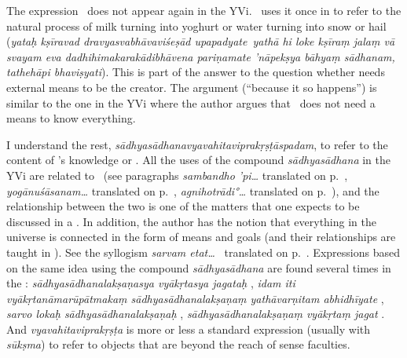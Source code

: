 {  The expression \dravyasvabhava\ does not appear again in the YVi.  \Sankara\ uses it once in  to refer to the natural process of milk turning into yoghurt or water turning into snow or hail (\emph{yataḥ kṣīravad dravyasvabhāvaviśeṣād upa\-padya\-te\dd\ yathā hi loke kṣīraṃ jalaṃ vā svayam eva dadhihimakarakādibhāvena pariṇamate ’nāpekṣya bāhyaṃ sādhanam, tathehāpi bhaviṣyati\dd}).  This is part of the answer to the question whether \Brahman{} needs external means to be the creator.  The argument (``because it so happens'') is similar to the one in the YVi where the author argues that \Isvara\ does not need a means to know everything.  %

I understand the rest, \emph{sādhyasādhanavyavahitaviprakṛṣṭāspadam}, to refer to the content of \Isvara's knowledge or \sastra.  All the uses of the compound \emph{sādhyasādhana} in the YVi are related to \sastra\ (see paragraphs \emph{sambandho 'pi\ldots}  translated on p.~\pageref{SMBDHPI}, \emph{yogānuśāsanam\ldots}  translated on p.~\pageref{YGNSSM}, \emph{agnihotrādi°\ldots}  translated on p.~\pageref{AGNIHTR}), and the relationship between the two is one of the matters that one expects to be discussed in a \sastra.  In addition, the author has the notion that everything in the universe is connected in the form of means and goals (and their relationships are taught in \sastra).  See the syllogism \emph{sarvam etat\ldots}\  translated on p.~\pageref{UNIGOAL}.  Expressions based on the same idea using the compound \emph{sādhyasādhana} are found several times in the \BAUBh:   \emph{sādhyasādhanalakṣaṇasya vyākṛtasya jagataḥ} \citep[66]{bau},  \emph{idam iti vyākṛtanāmarūpātmakaṃ sādhyasādhanalakṣaṇaṃ yathāvarṇitam abhidhīyate} \citep[67]{bau},  \emph{sarvo lokaḥ sādhyasādhanalakṣaṇaḥ} \citep[122]{bau},  \emph{sādhyasādhanalakṣaṇaṃ vyākṛtaṃ jagat} \citep[138]{bau}.  And \emph{vyavahitaviprakṛṣṭa} is more or less a standard expression (usually with \emph{sūkṣma}) to refer to objects that are beyond the reach of sense faculties.

}
